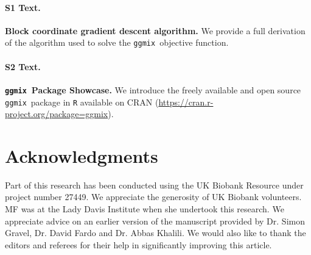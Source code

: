 \documentclass[10pt,letterpaper]{article}
\newcommand{\ggmix}{\texttt{ggmix}}
\begin{document}
\paragraph*{S1 Text.}
\label{S1_Text}
{\bf Block coordinate gradient descent algorithm.} We provide a full derivation of the algorithm used to solve the \ggmix ~objective function.


\paragraph*{S2 Text.}
\label{S2_Text}
{\bf \ggmix ~Package Showcase.} We introduce the freely available and open source \ggmix ~package in \texttt{R} available on CRAN (\url{https://cran.r-project.org/package=ggmix}).




\section*{Acknowledgments}
Part of this research has been conducted using the UK Biobank Resource under project number 27449. We appreciate the generosity of UK Biobank volunteers. MF was at the Lady Davis Institute when she undertook this research. We appreciate advice on an earlier version of the manuscript provided by Dr. Simon Gravel, Dr. David Fardo and Dr. Abbas Khalili. We would also like to thank the editors and referees for their help in significantly improving this article. 






\nolinenumbers

%
%
% 
\end{document}
